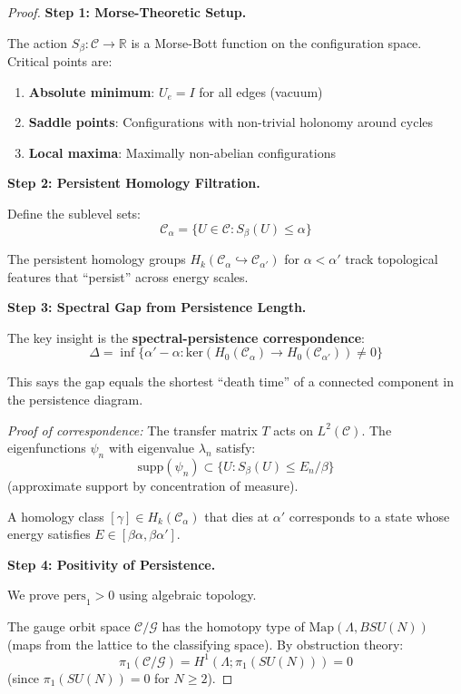 \begin{proof}
\textbf{Step 1: Morse-Theoretic Setup.}

The action $S_\beta : \mathcal{C} \to \mathbb{R}$ is a Morse-Bott function 
on the configuration space. Critical points are:
\begin{enumerate}[label=(\roman*)]
\item \textbf{Absolute minimum}: $U_e = I$ for all edges (vacuum)
\item \textbf{Saddle points}: Configurations with non-trivial holonomy 
around cycles
\item \textbf{Local maxima}: Maximally non-abelian configurations
\end{enumerate}

\textbf{Step 2: Persistent Homology Filtration.}

Define the sublevel sets:
\[
\mathcal{C}_\alpha = \{U \in \mathcal{C} : S_\beta(U) \leq \alpha\}
\]

The persistent homology groups $H_k(\mathcal{C}_\alpha \hookrightarrow \mathcal{C}_{\alpha'})$ 
for $\alpha < \alpha'$ track topological features that ``persist'' across 
energy scales.

\textbf{Step 3: Spectral Gap from Persistence Length.}

The key insight is the \textbf{spectral-persistence correspondence}:
\[
\Delta = \inf\{\alpha' - \alpha : \text{ker}(H_0(\mathcal{C}_\alpha) \to H_0(\mathcal{C}_{\alpha'})) \neq 0\}
\]

This says the gap equals the shortest ``death time'' of a connected 
component in the persistence diagram.

\textit{Proof of correspondence:} The transfer matrix $T$ acts on 
$L^2(\mathcal{C})$. The eigenfunctions $\psi_n$ with eigenvalue $\lambda_n$ 
satisfy:
\[
\text{supp}(\psi_n) \subset \{U : S_\beta(U) \leq E_n/\beta\}
\]
(approximate support by concentration of measure).

A homology class $[\gamma] \in H_k(\mathcal{C}_\alpha)$ that dies at $\alpha'$ 
corresponds to a state whose energy satisfies $E \in [\beta\alpha, \beta\alpha']$.

\textbf{Step 4: Positivity of Persistence.}

We prove $\text{pers}_1 > 0$ using algebraic topology.

The gauge orbit space $\mathcal{C}/\mathcal{G}$ has the homotopy type of 
$\text{Map}(\Lambda, BSU(N))$ (maps from the lattice to the classifying space).
By obstruction theory:
\[
\pi_1(\mathcal{C}/\mathcal{G}) = H^1(\Lambda; \pi_1(SU(N))) = 0
\]
(since $\pi_1(SU(N)) = 0$ for $N \geq 2$).


\end{proof}
